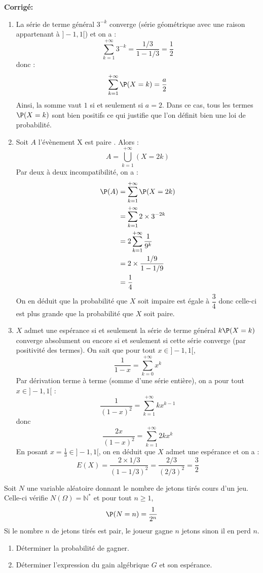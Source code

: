 \documentclass[a4paper,twoside,french,11pt]{VcCours}
\newcommand{\corr}{\textbf{Corrigé:}}
\begin{document}
\corr 

\begin{enumerate}
\item La série de terme général $3^{-k}$ converge (série géométrique avec une raison appartenant à $]-1,1[$) et on a :
$$ \sum_{k=1}^{+ \infty} 3^{-k} = \dfrac{1/3}{1-1/3}= \dfrac{1}{2}$$
donc :
$$ \sum_{k=1}^{+ \infty} \P(X=k) = \dfrac{a}{2}$$
Ainsi, la somme vaut $1$ si et seulement si $a=2$. Dans ce cas, tous les termes $\P(X=k)$ sont bien positifs ce qui justifie que l'on définit bien une loi de probabilité.
\item Soit $A$ l'évènement \og X est paire \fg. Alors :
$$ A = \bigcup_{k=1}^{+ \infty} (X=2k)$$
Par deux à deux incompatibilité, on a :
\begin{align*}
 \P(A) & = \sum_{k=1}^{+ \infty} \P(X=2k) \\
 & = \sum_{k=1}^{+ \infty} 2 \times 3^{-2k} \\
 & = 2 \sum_{k=1}^{+ \infty} \dfrac{1}{9^k} \\
 & = 2 \times \dfrac{1/9}{1-1/9} \\
 & = \dfrac{1}{4} 
 \end{align*}
On en déduit que la probabilité que $X$ soit impaire est égale à $\dfrac{3}{4}$ donc celle-ci est plus grande que la probabilité que $X$ soit paire.
\item $X$ admet une espérance si et seulement la série de terme général $k\P(X=k)$ converge absolument ou encore si et seulement si cette série converge (par positivité des termes). On sait que pour tout $x \in ]-1,1[$,
$$ \dfrac{1}{1-x} = \sum_{k=0}^{+ \infty} x^k$$
Par dérivation terme à terme (somme d'une série entière), on a pour tout $x \in ]-1,1[$ :
$$ \dfrac{1}{(1-x)^2} = \sum_{k=1}^{+ \infty} k x^{k-1}$$
donc
$$ \dfrac{2x}{(1-x)^2} = \sum_{k=1}^{+ \infty} 2k x^{k}$$
En posant $x= \tfrac{1}{3} \in  ]-1,1[$, on en déduit que $X$ admet une espérance et on a :
$$ E(X) = \dfrac{2 \times 1/3}{(1-1/3)^2} = \dfrac{2/3}{(2/3)^2}= \dfrac{3}{2}$$
\end{enumerate}




\begin{Exercice}{} Soit $N$ une variable aléatoire donnant le nombre de jetons tirés cours d'un jeu. Celle-ci vérifie $N(\Omega)= \mathbb{N}^*$ et pour tout $n \geq 1$,
$$ \P(N=n) = \dfrac{1}{2^n}$$
Si le nombre $n$ de jetons tirés est pair, le joueur gagne $n$ jetons sinon il en perd $n$.
\begin{enumerate}
\item Déterminer la probabilité de gagner.
\item Déterminer l'expression du gain algébrique $G$ et son espérance.
\end{enumerate}
\end{Exercice}
\end{document}
